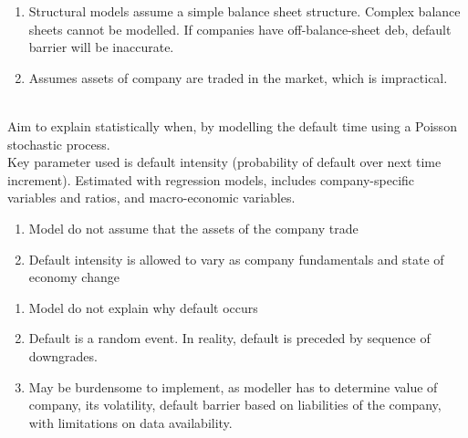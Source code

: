 \begin{remark} 
\begin{enumerate}[label=\roman*.]
\setlength{\itemsep}{0pt}
\item Structural models assume a simple balance sheet structure. Complex balance sheets cannot be modelled. If companies have off-balance-sheet deb, default barrier will be inaccurate.
\item Assumes assets of company are traded in the market, which is impractical.
\end{enumerate}
\end{remark}

\begin{remark} \\
Aim to explain statistically when, by modelling the default time using a Poisson stochastic process.\\
Key parameter used is default intensity (probability of default over next time increment). Estimated with regression models, includes company-specific variables and ratios, and macro-economic variables.
\end{remark}

\begin{remark} 
\begin{enumerate}[label=\roman*.]
\setlength{\itemsep}{0pt}
\item Model do not assume that the assets of the company trade
\item Default intensity is allowed to vary as company fundamentals and state of economy change
\end{enumerate}
\end{remark}

\begin{remark} 
\begin{enumerate}[label=\roman*.]
\setlength{\itemsep}{0pt}
\item Model do not explain why default occurs
\item Default is a random event. In reality, default is preceded by sequence of downgrades.
\item May be burdensome to implement, as modeller has to determine value of company, its volatility, default barrier based on liabilities of the company, with limitations on data availability.
\end{enumerate}
\end{remark}

